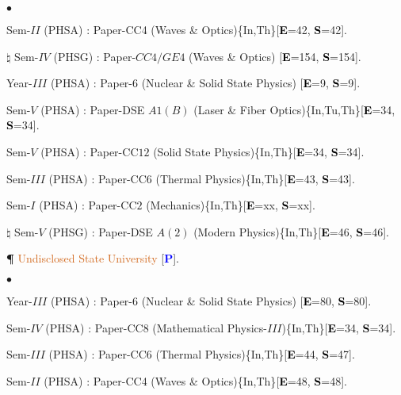 \documentclass[margin,line]{res}
\newenvironment{list1}{
  \begin{list}{\ding{113}}{%
      \setlength{\itemsep}{0in}
      \setlength{\parsep}{0in} \setlength{\parskip}{0in}
      \setlength{\topsep}{0in} \setlength{\partopsep}{0in} 
      \setlength{\leftmargin}{0.17in}}}{\end{list}}
\newenvironment{list2}{
  \begin{list}{$\bullet$}{%
      \setlength{\itemsep}{0in}
      \setlength{\parsep}{0in} \setlength{\parskip}{0in}
      \setlength{\topsep}{0in} \setlength{\partopsep}{0in} 
      \setlength{\leftmargin}{0.2in}}}{\end{list}}
\begin{document}
\begin{resume}
\begin{list2}
\item Sem-$II$ (PHSA) : Paper-CC4 (Waves \& Optics)\textcolor{alizarin}{\{In,Th\}}[\textcolor{black}{\bf E}=42, \textcolor{black}{\bf S}=42]. 
\item[$\pmb{\natural}$] Sem-$IV$ (PHSG) : Paper-$CC4/GE4$ (Waves \& Optics) [\textcolor{black}{\bf E}=154, \textcolor{black}{\bf S}=154]. 
\item Year-$III$ (PHSA) : Paper-6 (Nuclear \& Solid State Physics) [\textcolor{black}{\bf E}=9, \textcolor{black}{\bf S}=9]. 
\item Sem-$V$ (PHSA) : Paper-DSE $A1(B)$ (Laser \& Fiber Optics)\textcolor{alizarin}{\{In,Tu,Th\}}[\textcolor{black}{\bf E}=34, \textcolor{black}{\bf S}=34]. 
\item Sem-$V$ (PHSA) : Paper-CC$12$ (Solid State Physics)\textcolor{alizarin}{\{In,Th\}}[\textcolor{black}{\bf E}=34, \textcolor{black}{\bf S}=34]. 
\item Sem-$III$ (PHSA) : Paper-CC6 (Thermal Physics)\textcolor{alizarin}{\{In,Th\}}[\textcolor{black}{\bf E}=43, \textcolor{black}{\bf S}=43]. 
\item Sem-$I$ (PHSA) : Paper-CC$2$ (Mechanics)\textcolor{alizarin}{\{In,Th\}}[\textcolor{black}{\bf E}=xx, \textcolor{black}{\bf S}=xx]. 
\item[$\pmb{\natural}$] Sem-$V$ (PHSG) : Paper-DSE $A(2)$ (Modern Physics)\textcolor{alizarin}{\{In,Th\}}[\textcolor{black}{\bf E}=46, \textcolor{black}{\bf S}=46].
\item[{\bf \P}] \textcolor{chocolate}{Undisclosed State University} [\textcolor{blue}{\bf P}]. 
\end{list2}
\begin{list1}
\item[] \textcolor{iris}{}
\vspace{1mm}
\end{list1}
\begin{list2}
\item Year-$III$ (PHSA) : Paper-6 (Nuclear \& Solid State Physics) [\textcolor{black}{\bf E}=80, \textcolor{black}{\bf S}=80]. 
\item Sem-$IV$ (PHSA) : Paper-CC8 (Mathematical Physics-$III$)\textcolor{alizarin}{\{In,Th\}}[\textcolor{black}{\bf E}=34, \textcolor{black}{\bf S}=34]. 
\item Sem-$III$ (PHSA) : Paper-CC6 (Thermal Physics)\textcolor{alizarin}{\{In,Th\}}[\textcolor{black}{\bf E}=44, \textcolor{black}{\bf S}=47]. 
\item Sem-$II$ (PHSA) : Paper-CC4 (Waves \& Optics)\textcolor{alizarin}{\{In,Th\}}[\textcolor{black}{\bf E}=48, \textcolor{black}{\bf S}=48]. 

\end{list2}
\end{resume}
\end{document}
